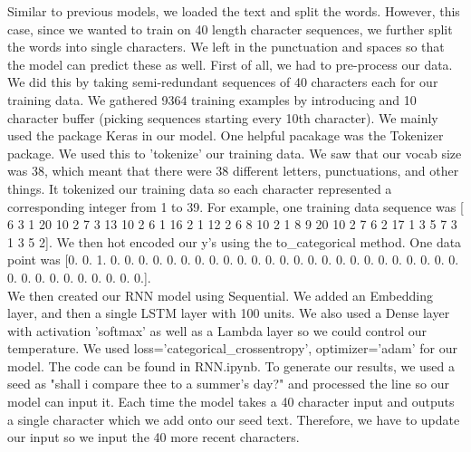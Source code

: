Similar to previous models, we loaded the text and split the words. However, this case, since we wanted to train on 40 length character sequences, we further split the words into single characters. We left in the punctuation and spaces so that the model can predict these as well. First of all, we had to pre-process our data. We did this by taking semi-redundant sequences of 40 characters each for our training data. We gathered 9364 training examples by introducing and 10 character buffer (picking sequences starting every 10th character). We mainly used the package Keras in our model. One helpful pacakage was the Tokenizer package. We used this to 'tokenize' our training data. We saw that our vocab size was 38, which meant that there were 38 different letters, punctuations, and other things. It tokenized our training data so each character represented a corresponding integer from 1 to 39. For example, one training data sequence was [ 6  3  1 20 10  2  7  3 13 10  2  6  1 16  2  1 12  2  6  8 10  2  1  8
9 20 10  2  7  6  2 17  1  3  5  7  3  1  3  5  2]. We then hot encoded our y's using the to_categorical method. One data point was [0. 0. 1. 0. 0. 0. 0. 0. 0. 0. 0. 0. 0. 0. 0. 0. 0. 0. 0. 0. 0. 0. 0. 0. 0. 0. 0. 0. 0. 0. 0. 0. 0. 0. 0. 0. 0. 0.].  \\
We then created our RNN model using Sequential. We added an Embedding layer, and then a single LSTM layer with 100 units. We also used a Dense layer with activation 'softmax' as well as a Lambda layer so we could control our temperature. We used loss='categorical_crossentropy', optimizer='adam' for our model. The code can be found in RNN.ipynb. To generate our results, we used a seed as "shall i compare thee to a summer's day?" and processed the line so our model can input it. Each time the model takes a 40 character input and outputs a single character which we add onto our seed text. Therefore, we have to update our input so we input the 40 more recent characters. \\
